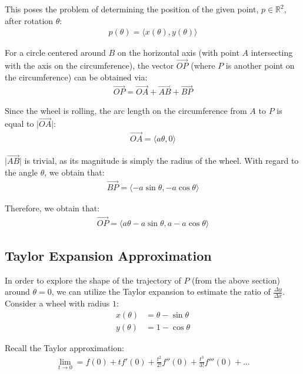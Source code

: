 \documentclass[12pt]{article}
\newcommand{\mo}[1]{\lvert #1 \rvert}
\newcommand{\RR}{\mathbb{R}}
\newcommand{\iv}[1]{\langle #1 \rangle}
\theoremstyle{definition}
\begin{document}
	This poses the problem of determining the position of the given point, $p \in \RR^2$, after rotation $\theta$:
	\begin{gather*}
		p(\theta) = \iv{x(\theta), y(\theta)}
	\end{gather*}
	
	For a circle centered around $B$ on the horizontal axis (with point $A$ intersecting with the axis on the circumference), the vector $\overrightarrow{OP}$ (where $P$ is another point on the circumference) can be obtained via:
	\begin{gather*}
		\overrightarrow{OP} = \overrightarrow{OA} + \overrightarrow{AB} + \overrightarrow{BP}
	\end{gather*}
	
	Since the wheel is rolling, the arc length on the circumference from $A$ to $P$ is equal to $\mo{\overrightarrow{OA}}$:
	\begin{gather*}
		\overrightarrow{OA} = \iv{a \theta, 0}
	\end{gather*}
	
	$\mo{\overrightarrow{AB}}$ is trivial, as its magnitude is simply the radius of the wheel. With regard to the angle $\theta$, we obtain that:
	\begin{gather*}
		\overrightarrow{BP} = \iv{-a \sin \theta, -a \cos \theta}
	\end{gather*}
	
	Therefore, we obtain that:
	\begin{gather*}
		\overrightarrow{OP} = \iv{a\theta - a \sin \theta, a - a \cos \theta}
 	\end{gather*}
 	
 	\subsection{Taylor Expansion Approximation}
 	
 	In order to explore the shape of the trajectory of $P$ (from the above section) around $\theta = 0$, we can utilize the Taylor expansion to estimate the ratio of $\frac{\Delta y}{\Delta x}$. Consider a wheel with radius $1$:
 	\begin{align*}
 		x(\theta) &= \theta - \sin \theta \\
 		y(\theta) &= 1 - \cos \theta
 	\end{align*}
 	
 	Recall the Taylor approximation:
 	\begin{gather*}
 		\lim_{t \to 0} = f(0) + tf'(0) + \frac{t^2}{2!}f''(0) + \frac{t^3}{3!}f'''(0) + \dots
 	\end{gather*}
 	
\end{document}
